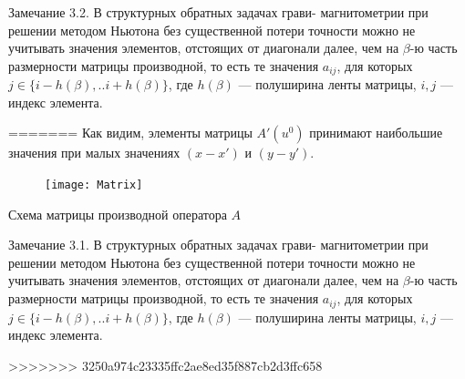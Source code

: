 \documentclass[10pt,pdf, mathserif, hyperref={unicode}]{beamer}
\begin{document}
\begin{frame}
	\begin{block}{Замечание 3.2.}
		В структурных обратных задачах грави- магнитометрии при решении методом Ньютона без существенной потери точности можно не учитывать значения элементов, отстоящих от диагонали далее, чем на  $\beta$-ю часть  размерности матрицы производной, то есть те значения $a_{ij}$, для которых  $j \in \{i-h(\beta),..i+h(\beta)\} $, где $h(\beta)$ --- полуширина ленты матрицы, $i, j$ --- индекс элемента.
	\end{block}
	\let\thefootnote\relax\let\thefootnote\relax{}
=======
Как видим, элементы матрицы $A'(u^0)$ принимают наибольшие значения при малых значениях $(x-x')$ и $(y-y')$.
\begin{figure}
	\texttt{[image: Matrix]}
\end{figure}
\centering Схема матрицы производной оператора $A$
\end{frame}
\begin{frame}
	\begin{block}{Замечание 3.1.}
		В структурных обратных задачах грави- магнитометрии при решении методом Ньютона без существенной потери точности можно не учитывать значения элементов, отстоящих от диагонали далее, чем на  $\beta$-ю часть  размерности матрицы производной, то есть те значения $a_{ij}$, для которых  $j \in \{i-h(\beta),..i+h(\beta)\} $, где $h(\beta)$ --- полуширина ленты матрицы, $i, j$ --- индекс элемента.
	\end{block}
	\let\thefootnote\relax\let\thefootnote\relax{}
>>>>>>> 3250a974c23335ffc2ae8ed35f887cb2d3ffc658
\end{frame}
\end{document}
